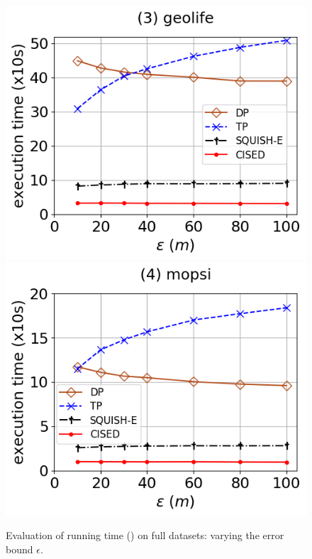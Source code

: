 \begin{figure}[tb!]
	\includegraphics[scale=0.315]{Figures/Exp-SED-time-epsilon-geolife.png}	\hspace{1ex}
	\includegraphics[scale=0.315]{Figures/Exp-SED-time-epsilon-mopsi.png}	\hspace{1ex}
	\vspace{-3ex}
	\caption{\small Evaluation of running time (\sed) on full datasets: varying the error bound $\epsilon$.}\label{fig:time-epsilon-sed}
	\vspace{-2ex}
\end{figure}

